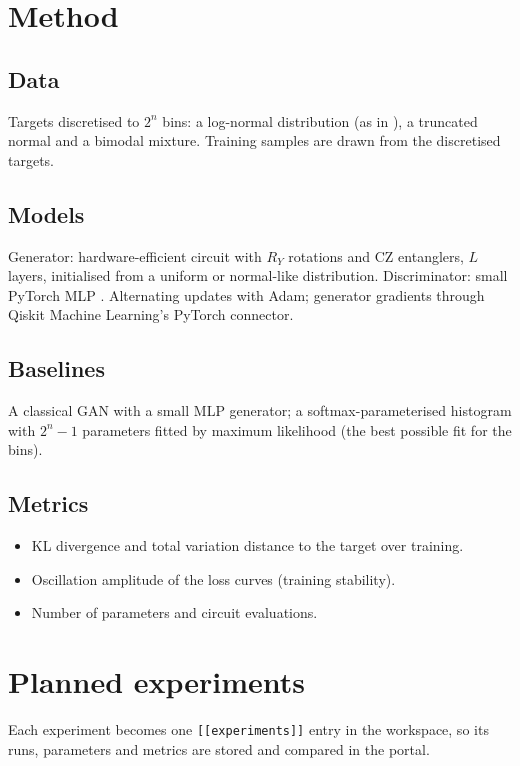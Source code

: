\documentclass[11pt,a4paper]{article}
\begin{document}
\section{Method}
\subsection{Data}
Targets discretised to $2^n$ bins: a log-normal distribution (as in \citealp{zoufal2019}), a
truncated normal and a bimodal mixture. Training samples are drawn from the discretised targets.

\subsection{Models}
Generator: hardware-efficient circuit with $R_Y$ rotations and CZ entanglers, $L$ layers, initialised
from a uniform or normal-like distribution. Discriminator: small PyTorch MLP \citep{paszke2019}.
Alternating updates with Adam; generator gradients through Qiskit Machine Learning's PyTorch connector.

\subsection{Baselines}
A classical GAN with a small MLP generator; a softmax-parameterised histogram with $2^n-1$
parameters fitted by maximum likelihood (the best possible fit for the bins).

\subsection{Metrics}
\begin{itemize}
  \item KL divergence and total variation distance to the target over training.
  \item Oscillation amplitude of the loss curves (training stability).
  \item Number of parameters and circuit evaluations.
\end{itemize}

\section{Planned experiments}
Each experiment becomes one \texttt{[[experiments]]} entry in the workspace, so its runs, parameters
and metrics are stored and compared in the portal.
\end{document}
